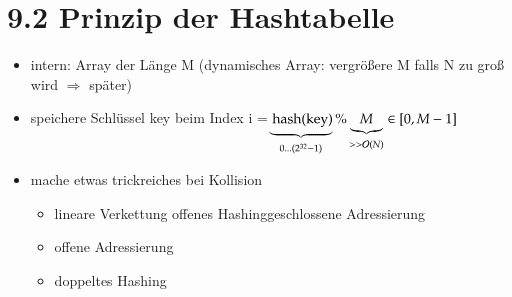 \section*{9.2 Prinzip der Hashtabelle}
\begin{itemize}
    \item intern: Array der Länge M (dynamisches Array: vergrößere M falls N zu groß wird $\Rightarrow$ später)
    \item speichere Schlüssel key beim Index i =$\underbrace{\text{ hash(key)}}_{0...(2^{32}-1)} \% \underbrace{M}_{>> \mathcal{O}{}(N)} \in [0, M-1]$
    \item mache etwas trickreiches bei Kollision
    \begin{itemize}
        \item lineare Verkettung \hspace*{5mm} \glqq offenes Hashing\grqq \glqq geschlossene Adressierung\grqq
        \item offene Adressierung
        \item doppeltes Hashing
    \end{itemize}
\end{itemize}

